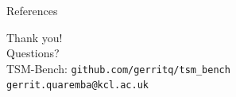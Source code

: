 \documentclass[aspectratio=169,xcolor=table]{beamer}
\begin{document}
\begin{frame}{References}
  \footnotesize
  
  
\end{frame}

\begin{frame}
  \centering
  {\Huge Thank you!}\\[0.6cm]
  {\Large Questions?}\\[1cm]
  \small
  TSM-Bench: \texttt{github.com/gerritq/tsm\_bench}\\[2pt]
  \texttt{gerrit.quaremba@kcl.ac.uk}
\end{frame}
\end{document}
